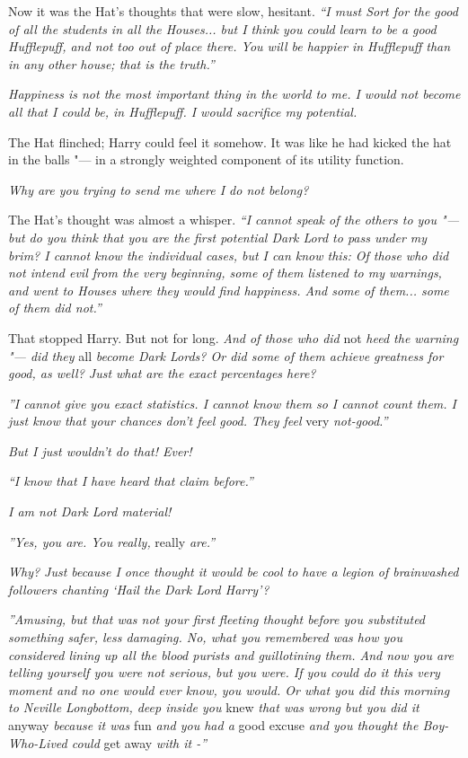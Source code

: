 Now it was the Hat's thoughts that were slow, hesitant. \emph{``I must
Sort for the good of all the students in all the Houses... but I
think you could learn to be a good Hufflepuff, and not too out of place
there. You will be happier in Hufflepuff than in any other house; that
is the truth.''}

\emph{Happiness is not the most important thing in the world to me. I
would not become all that I could be, in Hufflepuff. I would sacrifice
my potential.}

The Hat flinched; Harry could feel it somehow. It was like he had kicked
the hat in the balls "--- in a strongly weighted component of its utility
function.

\emph{Why are you trying to send me where I do not belong?}

The Hat's thought was almost a whisper. \emph{``I cannot speak of the
others to you "--- but do you think that you are the first potential Dark
Lord to pass under my brim? I cannot know the individual cases, but I
can know this: Of those who did not intend evil from the very beginning,
some of them listened to my warnings, and went to Houses where they
would find happiness. And some of them... some of them did not.''}

That stopped Harry. But not for long. \emph{And of those who did} not
\emph{heed the warning "--- did they} all \emph{become Dark Lords? Or did
some of them achieve greatness for good, as well? Just what are the
exact percentages here?}

\emph{''I cannot give you exact statistics. I cannot know them so I
cannot count them. I just know that your chances don't feel good. They
feel} very \emph{not-good.''}

\emph{But I just wouldn't do that! Ever!}

\emph{``I know that I have heard that claim before.''}

\emph{I am not Dark Lord material!}

\emph{''Yes, you are. You really,} really \emph{are.''}

\emph{Why? Just because I once thought it would be cool to have a legion
of brainwashed followers chanting `Hail the Dark Lord Harry'?}

\emph{''Amusing, but that was not your first fleeting thought before you
substituted something safer, less damaging. No, what you remembered was
how you considered lining up all the blood purists and guillotining
them. And now you are telling yourself you were not serious, but you
were. If you could do it this very moment and no one would ever know,
you would. Or what you did this morning to Neville Longbottom, deep
inside you} knew \emph{that was wrong but you did it} anyway
\emph{because it was} fun \emph{and you had a} good excuse \emph{and you
thought the Boy-Who-Lived could} get away \emph{with it -''}

